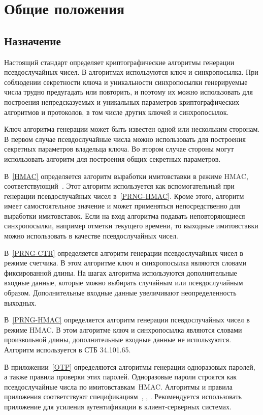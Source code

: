 \chapter{Общие положения}\label{COMMON}

\section{Назначение}\label{COMMON.Dest}

Настоящий стандарт определяет криптографические алгоритмы
генерации псевдослучайных чисел.
%
В алгоритмах используются ключ и синхропосылка.
%
При соблюдении секретности ключа и уникальности синхропосылки
генерируемые числа трудно предугадать или повторить,
и поэтому их можно использовать для построения непредсказуемых
и уникальных параметров криптографических алгоритмов и протоколов, 
в том числе других ключей и синхропосылок.

Ключ алгоритма генерации может быть известен одной или нескольким сторонам.
В первом случае псевдослучайные числа можно использовать для построения 
секретных параметров владельца ключа. 
Во втором случае стороны могут использовать алгоритм 
для построения общих секретных параметров.

В~\ref{HMAC} определяется алгоритм выработки имитовставки в режиме HMAC,
соответствующий~\cite{RFC-HMAC}.
%
Этот алгоритм используется как вспомогательный
при генерации псевдослучайных чисел в~\ref{PRNG-HMAC}.
%
Кроме этого, алгоритм имеет самостоятельное 
значение и может применяться непосредственно для 
выработки имитовставок. 
%
Если на вход алгоритма подавать неповторяющиеся 
синхропосылки, например отметки текущего времени,
то выходные имитовставки можно использовать в качестве 
псевдослучайных чисел.

В~\ref{PRNG-CTR} определяется алгоритм генерации псевдослучайных чисел 
в режиме счетчика. В этом алгоритме ключ и синхропосылка являются 
словами фиксированной длины. На шагах алгоритма используются дополнительные 
входные данные, которые можно выбирать случайным или псевдослучайным 
образом. 
Дополнительные входные данные увеличивают неопределенность выходных. 

В~\ref{PRNG-HMAC} определяется алгоритм генерации псевдослучайных чисел 
в режиме HMAC. В этом алгоритме ключ и синхропосылка являются словами 
произвольной длины, дополнительные входные данные не используются.
Алгоритм используется в СТБ 34.101.65.

В приложении~\ref{OTP} определяются алгоритмы генерации 
одноразовых паролей, а также правила проверки этих паролей. 
%
Одноразовые пароли строятся как псевдослучайные числа по 
имитовставкам~HMAC.  
%
Алгоритмы и правила приложения
соответствуют спецификациям~\cite{HOTP}, \cite{TOTP}, 
\cite{OCRA}. 
%
Рекомендуется использовать приложение для усиления 
аутентификации в клиент-серверных системах.

